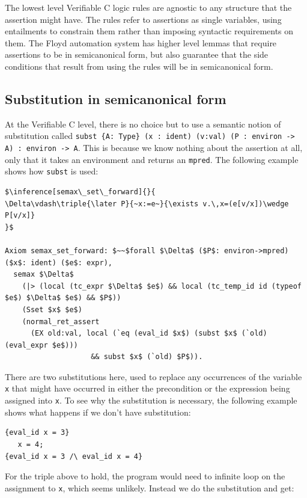 \documentclass{puthesis}
\begin{document}
The lowest level Verifiable C logic rules are agnostic to any
structure that the assertion might have. The rules refer to
assertions as single variables, using entailments to constrain them
rather than imposing syntactic requirements on them. The Floyd
automation system has higher level lemmas that require assertions
to be in semicanonical form, but also guarantee that the side
conditions that result from using the rules will be in semicanonical
form.

\subsection{Substitution in semicanonical form}

At the Verifiable C level, there is no choice but to use a semantic
notion of substitution called \linebreak
\lstinline|subst {A: Type} (x : ident) (v:val) (P : environ -> A) : environ -> A|.
This is because we know nothing about the assertion at all, only that
it takes an environment and returns an \lstinline|mpred|. The following example
shows how \lstinline|subst| is used:

\begin{lstlisting}
$\inference[semax\_set\_forward]{}{
\Delta\vdash\triple{\later P}{~x:=e~}{\exists v.\,x=(e[v/x])\wedge P[v/x]}
}$

Axiom semax_set_forward: $~~$forall $\Delta$ ($P$: environ->mpred) ($x$: ident) ($e$: expr),
  semax $\Delta$
    (|> (local (tc_expr $\Delta$ $e$) && local (tc_temp_id id (typeof $e$) $\Delta$ $e$) && $P$))
    (Sset $x$ $e$) 
    (normal_ret_assert 
      (EX old:val, local (`eq (eval_id $x$) (subst $x$ (`old) (eval_expr $e$)))
                    && subst $x$ (`old) $P$)).
\end{lstlisting}

There are two substitutions here, used to replace any occurrences of
the variable \lstinline|x| that might have occurred in either the
precondition or the expression being assigned into \lstinline|x|. To
see why the substitution is necessary, the following example shows
what happens if we don't have substitution:

\begin{verbatim}
{eval_id x = 3}
   x = 4;
{eval_id x = 3 /\ eval_id x = 4}
\end{verbatim}

For the triple above to hold, the program would need to infinite loop
on the assignment to \lstinline|x|, which seems unlikely. Instead we
do the substitution and get:
\end{document}
